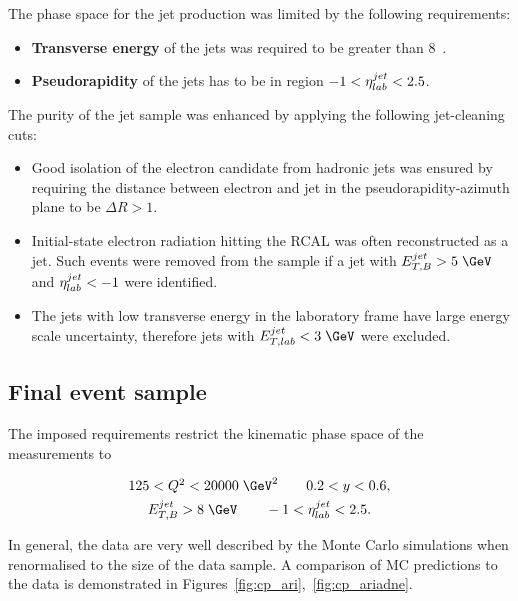 The phase space for the jet production was limited by the following requirements:
\begin{itemize}
	\item \textbf{Transverse energy} of the jets was required to be greater than 8~\GeV.
	\item \textbf{Pseudorapidity} of the jets has to be in region $-1<\mbox{$\eta^{jet}_{lab}$}<2.5$.
\end{itemize}
The purity of the jet sample was enhanced by applying the following jet-cleaning cuts:

\begin{itemize}
	\item Good isolation of the electron candidate from hadronic jets was ensured by requiring the distance between electron and jet in the pseudorapidity-azimuth plane to be $\Delta R > 1$.
	\item Initial-state electron radiation hitting the RCAL was often reconstructed as a jet. Such events were removed from the sample if a jet with $\etjetb > 5\;\GeV$ and $\mbox{$\eta^{jet}_{lab}$} < -1$ were identified.
	\item The jets with low transverse energy in the laboratory frame have large energy scale uncertainty, therefore jets with $\etjetlab < 3\;\GeV$ were excluded.
\end{itemize}

\subsection{Final event sample}
\label{subsec:eventsampletab}
The imposed requirements restrict the kinematic phase space of the measurements to

\begin{gather}
125 < \qsq < 20000\;\GeV^2 \qquad 0.2 < y < 0.6, \\
\etjetb > 8\;\GeV \qquad -1 < \etajetlab < 2.5.
\end{gather}

In general, the data are very well described by the Monte Carlo simulations when renormalised to the size of the data sample. A comparison of MC predictions to the data is demonstrated in Figures~\ref{fig:cp_ari},~\ref{fig:cp_ariadne}. 


